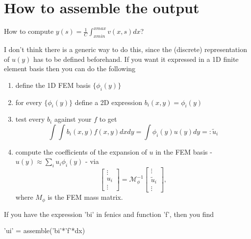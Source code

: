\documentclass[a4paper,10pt]{article}
\title{}
\author{Jan Heiland}
\begin{document}
\maketitle
\tableofcontents
%

\section{How to assemble the output}

How to compute $y(s) = \frac{1}{C}\int_{xmin}^{xmax} v(x,s) dx$?

I don't think there is a generic way to do this, since the (discrete) representation of $u(y)$ has to be defined beforehand. If you want it expressed in a 1D finite element basis then you can do the following

\begin{enumerate}
	\item define the 1D FEM basis $\{\phi_i(y)\}$
	\item for every $\{\phi_i(y)\}$ define a 2D expression $b_i(x,y) = \phi_i(y)$
	\item test every $b_i$ against your $f$ to get
		$$ \int \int b_i(x,y)f(x,y)dxdy=\int\phi_i(y)u(y)dy =: \tilde u_i
		$$
	\item compute the coefficients of the expansion of $u$ in the FEM basis - $u(y) \approx \sum_i u_i \phi_i(y)$ - via
		$$ \begin{bmatrix} \vdots \\ u_i \\ \vdots \end{bmatrix} = \mathcal M_{\phi}^{-1} \begin{bmatrix} \vdots \\ \tilde u_i \\ \vdots \end{bmatrix},
			$$
			where $M_\phi$ is the FEM mass matrix.
	\end{enumerate}

If you have the expression 'bi' in fenics and function 'f', then you find

    'ui' = assemble('bi'*'f'*dx)



\end{document}
